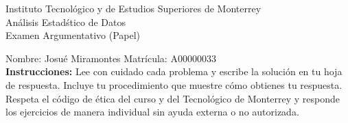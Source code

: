 \documentclass[10pt]{report}
\begin{document}
\newpage



\begin{center}
{\large Instituto Tecnol\'{o}gico y de Estudios Superiores de Monterrey \\
An\'alisis Estad\'stico de Datos } \\
Examen Argumentativo (Papel)
\end{center}

Nombre: \underline{\hspace*{.2in}}
Josué Miramontes
\underline{\hspace*{.2in}} \quad Matr\'icula:\underline{\hspace*{.2in}}
A00000033
\underline{\hspace*{.2in}} \\

{\bf Instrucciones:} Lee con cuidado cada problema y escribe la soluci\'on
en tu hoja de respuesta. Incluye tu procedimiento que muestre c\'omo obtienes tu respuesta.  Respeta el c\'odigo de \'etica del curso y del Tecnol\'ogico de Monterrey y responde los ejercicios de manera individual sin ayuda externa o no autorizada.
\end{document}
